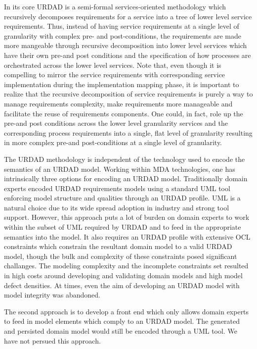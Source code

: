 In its core URDAD is a semi-formal services-oriented methodology which recursively decomposes requirements for a service into a tree of lower level service requirements. Thus, instead of having service requirements at a single level of granularity with complex pre- and post-conditions, the requirements are made more mangeable through recursive decomposition into lower level services which have their own pre-and post conditions and the specification of how processes are orchestrated across the lower level services. Note that, even though it is compelling to mirror the service requirements with corresponding service implementation during the implementation mapping phase, it is important to realize that the recursive decomposition of service requirements is purely a way to manage requirements complexity, make requirements more manageable and facilitate the reuse of requirements components. One could, in fact, role up the pre-and post conditions across the lower level granularity services and the corresponding process requirements into a single, flat level of granularity resulting in more complex pre-and post-conditions at a single level of granularity.

The URDAD methodology is independent of the technology used to encode the semantics of an URDAD model. Working within MDA technologies, one has intrinsically three options for encoding an URDAD model. Traditionally domain experts encoded URDAD requirements models using a standard UML tool enforcing model structure and qualities through an URDAD profile. UML is a natural choice due to its wide spread adoption in industry and strong tool support. However, this approach puts a lot of burden on domain experts to work within the subset of UML required by URDAD and to feed in the appropriate semantics into the model. It also requires an URDAD profile with extensive OCL constraints which constrain the resultant domain model to a valid URDAD model, though the bulk and complexity of these constraints posed significant challanges. The modeling complexity and the incomplete constraints set resulted in high costs around developing and validating domain models and high model defect densities. At times, even the aim of developing an URDAD model with model integrity was abandoned.

The second approach is to develop a front end which only allows domain experts to feed in model elements which comply to an URDAD model. The generated and persisted domain model would still be encoded through a UML tool. We have not persued this approach.

